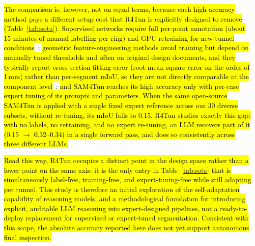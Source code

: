 \hl{The comparison is, however, not on equal terms, because each high-accuracy method pays a different setup cost that R4Tun is explicitly designed to remove (Table~\ref{tab:sota}). Supervised networks require full per-point annotation (about 15 minutes of manual labelling per ring) and GPU retraining for new tunnel conditions}~; \hl{geometric feature-engineering methods avoid training but depend on manually tuned thresholds and often on original design documents, and they typically report cross-section fitting error (root-mean-square error on the order of 1\,mm) rather than per-segment mIoU, so they are not directly comparable at the component level}~; \hl{and SAM4Tun reaches its high accuracy only with per-case expert tuning of its prompts and parameters. When the same open-source SAM4Tun is applied with a single fixed expert reference across our 30 diverse subsets, without re-tuning, its mIoU falls to 0.15. R4Tun studies exactly this gap: with no labels, no retraining, and no expert re-tuning, an LLM recovers part of it (0.15 $\rightarrow$ 0.32--0.34) in a single forward pass, and does so consistently across three different LLMs.}

\hl{Read this way, R4Tun occupies a distinct point in the design space rather than a lower point on the same axis: it is the only entry in Table~\ref{tab:sota} that is simultaneously label-free, training-free, and expert-tuning-free while still adapting per tunnel. This study is therefore an initial exploration of the self-adaptation capability of reasoning models, and a methodological foundation for introducing explicit, auditable LLM reasoning into expert-designed pipelines, not a ready-to-deploy replacement for supervised or expert-tuned segmentation. Consistent with this scope, the absolute accuracy reported here does not yet support autonomous final inspection.}

